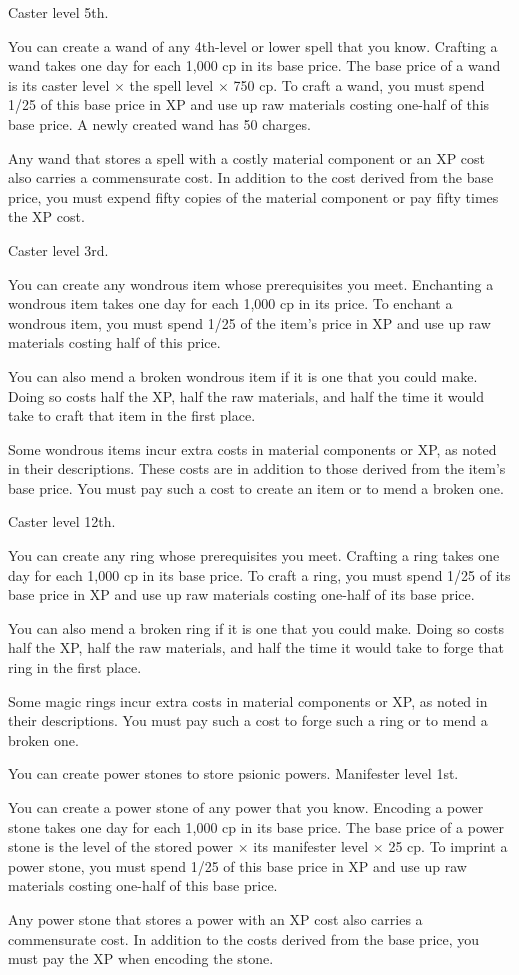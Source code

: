 {Caster level 5th.}
{You can create a wand of any 4th-level or lower spell that you know. Crafting a wand takes one day for each 1,000 cp in its base price. The base price of a wand is its caster level $\times$ the spell level $\times$ 750 cp. To craft a wand, you must spend 1/25 of this base price in XP and use up raw materials costing one-half of this base price. A newly created wand has 50 charges.

Any wand that stores a spell with a costly material component or an XP cost also carries a commensurate cost. In addition to the cost derived from the base price, you must expend fifty copies of the material component or pay fifty times the XP cost.}

{Caster level 3rd.}
{You can create any wondrous item whose prerequisites you meet. Enchanting a wondrous item takes one day for each 1,000 cp in its price. To enchant a wondrous item, you must spend 1/25 of the item's price in XP and use up raw materials costing half of this price.

You can also mend a broken wondrous item if it is one that you could make. Doing so costs half the XP, half the raw materials, and half the time it would take to craft that item in the first place.

Some wondrous items incur extra costs in material components or XP, as noted in their descriptions. These costs are in addition to those derived from the item's base price. You must pay such a cost to create an item or to mend a broken one.}

{Caster level 12th.}
{You can create any ring whose prerequisites you meet. Crafting a ring takes one day for each 1,000 cp in its base price. To craft a ring, you must spend 1/25 of its base price in XP and use up raw materials costing one-half of its base price.

You can also mend a broken ring if it is one that you could make. Doing so costs half the XP, half the raw materials, and half the time it would take to forge that ring in the first place.

Some magic rings incur extra costs in material components or XP, as noted in their descriptions. You must pay such a cost to forge such a ring or to mend a broken one.}

{You can create power stones to store psionic powers.}
{Manifester level 1st.}
{You can create a power stone of any power that you know. Encoding a power stone takes one day for each 1,000 cp in its base price. The base price of a power stone is the level of the stored power $\times$ its manifester level $\times$ 25 cp. To imprint a power stone, you must spend 1/25 of this base price in XP and use up raw materials costing one-half of this base price.

Any power stone that stores a power with an XP cost also carries a commensurate cost. In addition to the costs derived from the base price, you must pay the XP when encoding the stone.}{}{}


